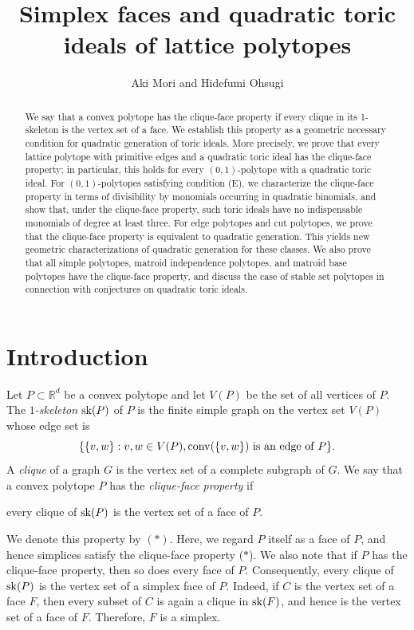 \documentclass[12pt]{amsart}
\title{Simplex faces and quadratic toric ideals of lattice polytopes}
\author{Aki Mori and Hidefumi Ohsugi}
\date{}
\theoremstyle{definition}
\numberwithin{thm}{section}
\numberwithin{equation}{section}
\def\NZQ{\mathbb}               %
\def\RR{{\NZQ R}}
\begin{document}
\begin{abstract}
We say that a convex polytope has the clique-face property if every clique in its 1-skeleton is the vertex set of a face.
We establish this property as a geometric necessary condition for quadratic generation of toric ideals. More precisely, we prove that every lattice polytope with primitive edges and a quadratic toric ideal has the clique-face property; in particular, this holds for every 
$(0,1)$-polytope with a quadratic toric ideal. 
For $(0,1)$-polytopes satisfying condition (E), we characterize the clique-face property in terms of divisibility by monomials occurring in quadratic binomials, 
and show that, under the clique-face property, such toric ideals have no indispensable monomials of degree at least three.
For edge polytopes and cut polytopes, we prove that the clique-face property is equivalent to quadratic generation. 
This yields new geometric characterizations of quadratic generation for these classes.
We also prove that all simple polytopes, matroid independence polytopes, and matroid base polytopes have the clique-face property, and discuss the case of stable set polytopes in connection with conjectures on quadratic toric ideals.
\end{abstract}

\maketitle


\section{Introduction}
Let $P \subset \RR^d$ be a convex polytope
and let $V(P)$ be the set of all vertices of $P$. 
The \textit{$1$-skeleton} ${\rm sk}(P)$ of $P$ is the finite simple graph on the vertex set $V(P)$ whose edge set is
$$
\{\{v, w\} : v,w \in V(P), {\rm conv}(\{v,w\}) \mbox{ is an edge of } P\}.
$$
A \textit{clique} of a graph $G$ is the vertex set of a complete subgraph of $G$.   
We say that a convex polytope \(P\) has the \textit{clique-face property} if

\smallskip

\begin{center}
    every clique of ${\rm sk}(P)$ is the vertex set of a face of $P$.   
\end{center}

\smallskip

\noindent
We denote this property by \((*)\).
Here, we regard $P$ itself as a face of $P$,
and hence simplices satisfy the clique-face property ($*$).
We also note that if \(P\) has the clique-face property, then so does every face of \(P\). Consequently, every clique of \({\rm sk}(P)\) is the vertex set of a simplex face of \(P\). Indeed, if \(C\) is the vertex set of a face \(F\), then every subset of \(C\) is again a clique in \({\rm sk}(F)\), and hence is the vertex set of a face of \(F\). Therefore, \(F\) is a simplex.
\end{document}
